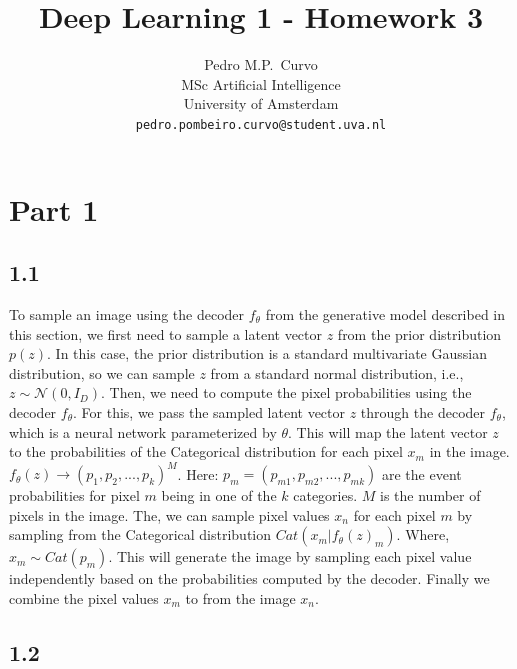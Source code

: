 \documentclass{article}
\title{Deep Learning 1 - Homework 3}
\author{%
  Pedro M.P.~Curvo \\
  MSc Artificial Intelligence\\
  University of Amsterdam\\
  \texttt{pedro.pombeiro.curvo@student.uva.nl} \\
}
\begin{document}
\maketitle




\section*{Part 1}

\subsection*{1.1}

To sample an image using the decoder $f_{\theta}$ from the generative model described in this section, we first
need to sample a latent vector $z$ from the prior distribution $p(z)$. In this case, the prior distribution is a
standard multivariate Gaussian distribution, so we can sample $z$ from a standard normal distribution, i.e., $z \sim \mathcal{N}(0, I_D)$.
Then, we need to compute the pixel probabilities using the decoder $f_{\theta}$. For this, we pass
the sampled latent vector $z$ through the decoder $f_{\theta}$, which is a neural network parameterized by $\theta$.
This will map the latent vector $z$ to the probabilities of the Categorical distribution for each pixel $x_m$ in the image.
$f_{\theta}(z) \rightarrow (p_1, p_2, ..., p_k)^M$. 
Here: $p_m = (p_{m1}, p_{m2}, ..., p_{mk})$ are the event probabilities for pixel $m$ being in one of the $k$ categories.
$M$ is the number of pixels in the image. 
The, we can sample pixel values $x_n$ for each pixel $m$ by sampling from the Categorical distribution $Cat(x_m | f_{\theta}(z)_m)$.
Where, $x_m \sim Cat(p_m)$. This will generate the image by sampling each pixel value independently based on the
probabilities computed by the decoder. 
Finally we combine the pixel values $x_m$ to from the image $x_n$. 

\subsection*{1.2}
\end{document}
